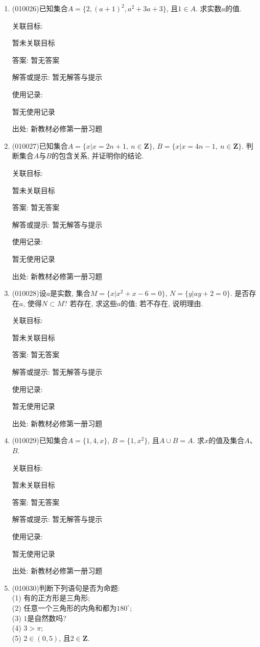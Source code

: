 \documentclass[10pt,a4paper]{article}
\begin{document}
\begin{enumerate}[1.]
关联目标:

暂未关联目标

答案: 暂无答案

解答或提示: 暂无解答与提示

使用记录:

暂无使用记录


出处: 新教材必修第一册习题
\item { (010026)}已知集合$A=\{2, (a+1)^2, a^2+3a+3\}$, 且$1\in A$. 求实数$a$的值.


关联目标:

暂未关联目标

答案: 暂无答案

解答或提示: 暂无解答与提示

使用记录:

暂无使用记录


出处: 新教材必修第一册习题
\item { (010027)}已知集合$A=\{x|x=2n+1,\ n\in \mathbf{Z}\}$, $B=\{x|x=4n-1,\ n\in \mathbf{Z}\}$. 判断集合$A$与$B$的包含关系, 并证明你的结论.


关联目标:

暂未关联目标

答案: 暂无答案

解答或提示: 暂无解答与提示

使用记录:

暂无使用记录


出处: 新教材必修第一册习题
\item { (010028)}设$a$是实数, 集合$M=\{x|x^2+x-6=0\}$, $N=\{y|ay+2=0\}$. 是否存在$a$, 使得$N\subset M$? 若存在, 求这些$a$的值; 若不存在, 说明理由.


关联目标:

暂未关联目标

答案: 暂无答案

解答或提示: 暂无解答与提示

使用记录:

暂无使用记录


出处: 新教材必修第一册习题
\item { (010029)}已知集合$A=\{1, 4, x\}$, $B=\{1, x^2\}$, 且$A\cup B=A$. 求$x$的值及集合$A$、$B$.


关联目标:

暂未关联目标

答案: 暂无答案

解答或提示: 暂无解答与提示

使用记录:

暂无使用记录


出处: 新教材必修第一册习题
\item { (010030)}判断下列语句是否为命题:\\
(1) 有的正方形是三角形;\\
(2) 任意一个三角形的内角和都为$180^\circ$;\\
(3) $1$是自然数吗?\\
(4) $3>\pi$;\\
(5) $2\in (0, 5)$, 且$2\in \mathbf{Z}$.



\end{enumerate}
\end{document}
